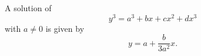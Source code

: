 \begin{proposition}
    A solution of
\[
    y^3=a^3+bx+cx^2+dx^3
\]
    with $a\ne0$ is given by
\[
    y=a+\frac{b}{3a^2}x.
\]
\end{proposition}
